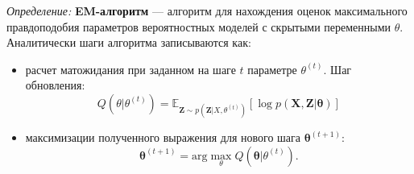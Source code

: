 \textit{Определение:} \textbf{EM-алгоритм} --- алгоритм для нахождения оценок
максимального правдоподобия параметров  вероятностных моделей с скрытыми переменными $\theta$.
Аналитически шаги алгоритма записываются как: 
\begin{itemize}
    \item расчет матожидания при заданном на шаге $t$ параметре $\theta^{(t)}$.
    Шаг обновления:
    \begin{equation}
        Q(\theta| \theta^{(t)}) = \mathbb{E}_{\mathbf{Z} \sim p(\mathbf{Z}|X,\theta^{(t)})} \left[ \log p(\mathbf{X},\mathbf{Z}|\mathbf{\theta})\right]
    \end{equation}
    \item максимизации полученного выражения для нового шага $\mathbf{\theta}^{(t+1)}$: 
    \begin{equation}
        \mathbf{\theta}^{(t+1)} = \text{arg} \max_{\theta} Q(\mathbf{\theta}|\theta^{(t)}).
    \end{equation}  
\end{itemize}
